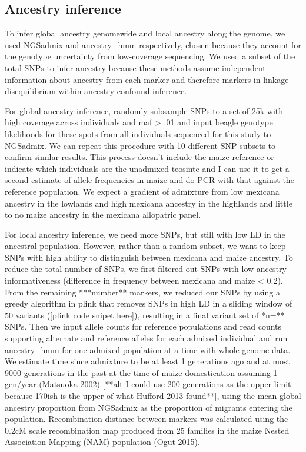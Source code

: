 \documentclass[12pt]{report}
\begin{document}
\subsection{Ancestry inference}
To infer global ancestry genomewide and local ancestry along the genome, we used NGSadmix and ancestry\_hmm respectively, chosen because they account for the genotype uncertainty from low-coverage sequencing. We used a subset of the total SNPs to infer ancestry because these methods assume independent information about ancestry from each marker and therefore markers in linkage disequilibrium within ancestry confound inference.\par
For global ancestry inference, randomly subsample SNPs to a set of 25k with high coverage across individuals and maf > .01 and input beagle genotype likelihoods for these spots from all individuals sequenced for this study to NGSadmix. We can repeat this procedure with 10 different SNP subsets to confirm similar results. This process doesn't include the maize reference or indicate which individuals are the unadmixed teosinte and I can use it to get a second estimate of allele frequencies in maize and do PCR with that against the reference population. We expect a gradient of admixture from low mexicana ancestry in the lowlands and high mexicana ancestry in the highlands and little to no maize ancestry in the mexicana allopatric panel.\par

For local ancestry inference, we need more SNPs, but still with low LD in the ancestral population. However, rather than a random subset, we want to keep SNPs with high ability to distinguish between mexicana and maize ancestry. To reduce the total number of SNPs, we first filtered out SNPs with low ancestry informativeness (difference in frequency between mexicana and maize < 0.2). From the remaining ***number** markers, we reduced our SNPs by using a greedy algorithm in plink that removes SNPs in high LD in a sliding window of 50 variants ([plink code snipet here]), resulting in a final variant set of *n=** SNPs. Then we input allele counts for reference populations and read counts supporting alternate and reference alleles for each admixed individual and run ancestry\_hmm for one admixed population at a time with whole-genome data. We estimate time since admixture to be at least 1 generations ago and at most 9000 generations in the past at the time of maize domestication assuming 1 gen/year (Matsuoka 2002) [**alt I could use 200 generations as the upper limit because 170ish is the upper of what Hufford 2013 found**], using the mean global ancestry proportion from NGSadmix as the proportion of migrants entering the population. Recombination distance between markers was calculated using the 0.2cM scale recombination map produced from 25 families in the maize Nested Association Mapping (NAM) population (Ogut 2015).\par
\end{document}
